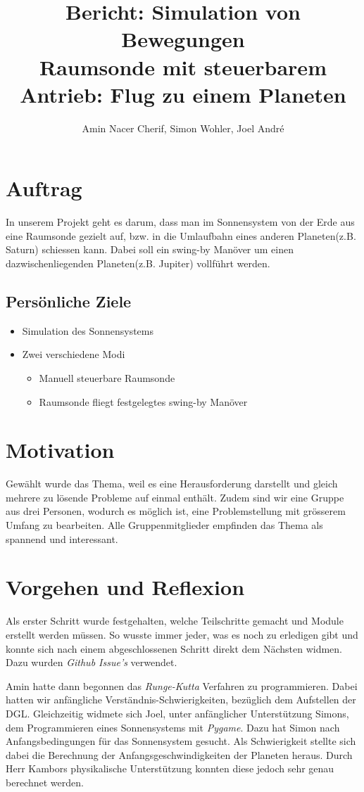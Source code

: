 \documentclass{article}
\title{
	Bericht: Simulation von Bewegungen \\
	\large Raumsonde mit steuerbarem Antrieb: Flug zu einem Planeten}
\author{Amin Nacer Cherif, Simon Wohler, Joel André}
\begin{document}
\maketitle

\section{Auftrag}
In unserem Projekt geht es darum, dass man im Sonnensystem von der Erde aus eine Raumsonde gezielt auf, bzw. in die Umlaufbahn eines anderen Planeten(z.B. Saturn) schiessen kann. Dabei soll ein swing-by Manöver um einen dazwischenliegenden Planeten(z.B. Jupiter) vollführt werden.

	\subsection{Persönliche Ziele}
		\begin{itemize} 
			\item Simulation des Sonnensystems
			\item Zwei verschiedene Modi
			\begin{itemize} 
				\item Manuell steuerbare Raumsonde
				\item Raumsonde fliegt festgelegtes swing-by Manöver
			\end{itemize}
		\end{itemize}

\section{Motivation}
Gewählt wurde das Thema, weil es eine Herausforderung darstellt und gleich mehrere zu lösende Probleme auf einmal enthält. Zudem sind wir eine Gruppe aus drei Personen, wodurch es möglich ist, eine Problemstellung mit grösserem Umfang zu bearbeiten. Alle Gruppenmitglieder empfinden das Thema als spannend und interessant.

\section{Vorgehen und Reflexion}
Als erster Schritt wurde festgehalten, welche Teilschritte gemacht und Module erstellt werden müssen. So wusste immer jeder, was es noch zu erledigen gibt und konnte sich nach einem abgeschlossenen Schritt direkt dem Nächsten widmen. 
Dazu wurden \textit{Github Issue's} verwendet. 

Amin hatte dann begonnen das \textit{Runge-Kutta} Verfahren zu programmieren. Dabei hatten wir anfängliche Verständnis-Schwierigkeiten, bezüglich dem Aufstellen der DGL.
Gleichzeitig widmete sich Joel, unter anfänglicher Unterstützung Simons, dem Programmieren eines Sonnensystems mit \textit{Pygame}. Dazu hat Simon nach Anfangsbedingungen für das Sonnensystem gesucht. Als Schwierigkeit stellte sich dabei die Berechnung der Anfangsgeschwindigkeiten der Planeten heraus. Durch Herr Kambors physikalische Unterstützung konnten diese jedoch sehr genau berechnet werden. 
\end{document}
